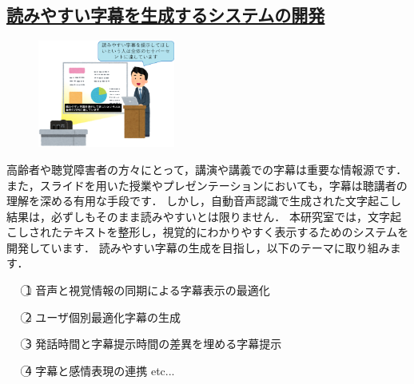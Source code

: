 \documentclass[10.5pt,onecolumn]{jsarticle}
\newcommand{\dg}{\gt}
\newcommand{\maru}[1]{\textcircled{\scriptsize #1}}
\begin{document}
    \vspace{-3mm}
    \subsection*{\underline{読みやすい字幕を生成するシステムの開発}}

    \begin{figure}
      \vspace{-20mm}
      \begin{center}
        \includegraphics[width=0.4\textwidth]{./pic/transcription.eps}\\
        \label{transcription}
      \end{center}
    \end{figure}


    高齢者や聴覚障害者の方々にとって，講演や講義での字幕は重要な情報源です．
    また，スライドを用いた授業やプレゼンテーションにおいても，字幕は聴講者の理解を深める有用な手段です．
    しかし，自動音声認識で生成された文字起こし結果は，必ずしもそのまま読みやすいとは限りません．
    本研究室では，文字起こしされたテキストを整形し，視覚的にわかりやすく表示するためのシステムを開発しています．
    読みやすい字幕の生成を目指し，以下のテーマに取り組みます．

    \begin{itemize}
      \item[\maru{1}] {\dg 音声と視覚情報の同期による字幕表示の最適化}
      \item[\maru{2}] {\dg ユーザ個別最適化字幕の生成}
      \item[\maru{3}] {\dg 発話時間と字幕提示時間の差異を埋める字幕提示}
      \item[\maru{4}] {\dg 字幕と感情表現の連携} etc...
    \end{itemize}
\end{document}
